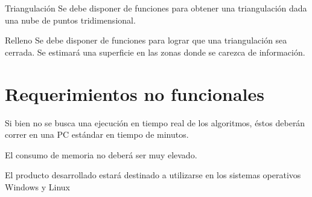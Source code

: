 		\Requerimiento
			{Triangulación}
			{Se debe disponer de funciones para obtener una triangulación dada una nube de puntos tridimensional.}

		\Requerimiento
			{Relleno}
			{Se debe disponer de funciones para lograr que una triangulación sea cerrada. Se
			estimará una superficie en las zonas donde se carezca de
			información.}

	\section{Requerimientos no funcionales}
		Si bien no se busca una ejecución en tiempo real de los algoritmos,
		éstos deberán correr en una PC estándar en tiempo de minutos.

		El consumo de memoria no deberá ser muy elevado.


		El producto desarrollado estará destinado a utilizarse en los sistemas
		operativos Windows y Linux
